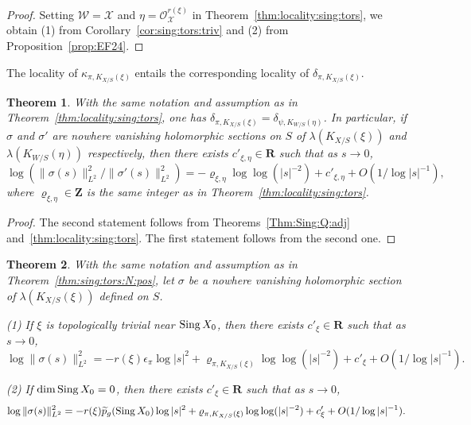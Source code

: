 \documentclass[amscd, leqno]{amsart}
\theoremstyle{plain}
\newtheorem{theorem}{Theorem}[section]
\theoremstyle{definition}
\theoremstyle{remark}
\newenvironment{pf}{\begin{proof}}{\end{proof}}
\begin{document}
\begin{pf}
Setting ${\mathcal W} = {\mathcal X}$ and $\eta = {\mathcal O}_{\mathcal X}^{r(\xi)}$ in Theorem~\ref{thm:locality:sing:tors}, 
we obtain (1) from Corollary~\ref{cor:sing:tors:triv} and (2) from Proposition~\ref{prop:EF24}.
\end{pf}


The locality of $\kappa_{\pi, K_{X/S}(\xi)}$ entails the corresponding locality of $\delta_{\pi, K_{X/S}(\xi)}$.


\begin{theorem}
\label{thm:sing:L2:N:pos:gen}
With the same notation and assumption as in Theorem~\ref{thm:locality:sing:tors}, 
one has $\delta_{\pi, K_{X/S}(\xi)} = \delta_{\psi, K_{W/S}(\eta)}$. In particular,
if $\sigma$ and $\sigma'$ are nowhere vanishing holomorphic sections on $S$ of $\lambda(K_{X/S}(\xi))$ and
$\lambda(K_{W/S}(\eta))$ respectively, then there exists $c'_{\xi,\eta} \in {\mathbf R}$ such that as $s \to 0$,
$$
\log ( \| \sigma(s) \|_{L^{2}}^{2} / \| \sigma'(s) \|_{L^{2}}^{2} ) =  -\varrho_{\xi,\eta} \log\log(|s|^{-2}) + c'_{\xi,\eta} + O(1/\log |s|^{-1}),
$$
where $\varrho_{\xi,\eta} \in {\mathbf Z}$ is the same integer as in Theorem~\ref{thm:locality:sing:tors}. 
\end{theorem}

\begin{pf}
The second statement follows from Theorems~\ref{Thm:Sing:Q:adj} and~\ref{thm:locality:sing:tors}. 
The first statement follows from the second one.
\end{pf}


\begin{theorem}
\label{thm:sing:L2:N:pos}
With the same notation and assumption as in Theorem~\ref{thm:sing:tors:N:pos},
let $\sigma$ be a nowhere vanishing holomorphic section of $\lambda(K_{X/S}(\xi))$ defined on $S$.  
\par{\rm (1)}
If $\xi$ is topologically trivial near ${\rm Sing}\,X_{0}$, then there exists $c'_{\xi} \in {\mathbf R}$  such that as $s \to 0$,
$$
\log \| \sigma(s) \|_{L^{2}}^{2} = -r(\xi) \epsilon_{\pi} \log |s|^{2} + \varrho_{\pi,K_{X/S}(\xi)}\log\log(|s|^{-2}) + c'_{\xi} + O(1/\log |s|^{-1}).
$$
\par{\rm (2)}
If $\dim {\rm Sing}\,X_{0} = 0$, then there exists $c'_{\xi} \in {\mathbf R}$  such that as $s \to 0$,
$$
\log  \| \sigma(s) \|_{L^{2}}^{2} 
= -r(\xi)  \widetilde{p}_{g}({\rm Sing}\,X_{0}) \log |s|^{2} + \varrho_{\pi, K_{X/S}(\xi)} \log\log (|s|^{-2}) + c'_{\xi} + O(1/\log |s|^{-1}).
$$
\end{theorem}
\end{document}
